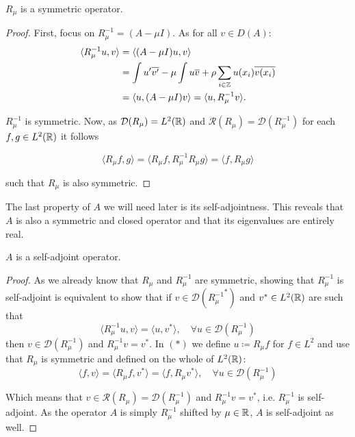 \begin{theorem} \label{2.2:thm-R_muSymmetric}
	$R_{\mu}$ is a symmetric operator.
	
	\begin{proof}
		First, focus on $R_{\mu}^{-1} = (A - \mu I)$. As for all $v \in D(A)$:
			\begin{align*}
				\langle R_{\mu}^{-1} u, v \rangle & = \langle (A - \mu I) u, v \rangle \\
					& = \int u'\overline{v'} -  \mu \int u \overline{v} + \rho \sum_{i \in \mathbb{Z}} u(x_{i}) \overline{v(x_{i})} \\
					& = \langle u, (A - \mu I) v \rangle = \langle u,  R_{\mu}^{-1} v \rangle.
			\end{align*}

		$R_{\mu}^{-1}$ is symmetric. Now, as $\mathcal{D}(R_{\mu}) = L^{2}(\mathbb{R})$ and $\mathcal{R}(R_{\mu}) = \mathcal{D}(R_{\mu}^{-1})$ for each $f, g \in L^{2}(\mathbb{R})$ it follows
		
		\[  \langle R_{\mu} f, g \rangle =  \langle R_{\mu} f, R_{\mu}^{-1} R_{\mu} g \rangle = \langle f, R_{\mu} g \rangle \]
		
		such that $R_{\mu}$ is also symmetric.
	\end{proof}
\end{theorem}

The last property of $A$ we will need later is its self-adjointness. This reveals that $A$ is also a symmetric and closed operator and that its eigenvalues are entirely real. 

\begin{theorem} \label{2.3:thm-ASelfAdjoint}
	$A$ is a self-adjoint operator.
		
	\begin{proof}
		As we already know that $R_{\mu}$ and $R_{\mu}^{-1}$ are symmetric, showing that $R_{\mu}^{-1}$ is self-adjoint is equivalent to show that if $v \in \mathcal{D}({R_{\mu}^{-1}}^{*})$ and $v^{*} \in L^{2}(\mathbb{R})$ are such that
		\[ \langle R_{\mu}^{-1} u, v \rangle = \langle u, v^{*} \rangle, \quad \forall u \in \mathcal{D}(R_{\mu}^{-1}) \tag*{(*)} \]
		then $v \in \mathcal{D}(R_{\mu}^{-1})$ and $R_{\mu}^{-1} v = v^{*}$.
		In $(*)$ we define $u \coloneqq R_{\mu} f$ for $f \in L^{2}$ and use that $R_{\mu}$ is symmetric and defined on the whole of $L^{2}(\mathbb{R})$:
		\[  \langle f, v \rangle = \langle R_{\mu} f, v^{*} \rangle = \langle f, R_{\mu} v^{*} \rangle, \quad \forall u \in \mathcal{D}(R_{\mu}^{-1}) \]
		
		Which means that $v \in \mathcal{R}(R_{\mu}) = \mathcal{D}(R_{\mu}^{-1})$ and $R_{\mu}^{-1} v = v^{*}$, i.e. $R_{\mu}^{-1}$ is self-adjoint. As the operator $A$ is simply $R_{\mu}^{-1}$ shifted by $\mu \in \mathbb{R}$, $A$ is self-adjoint as well.		
	\end{proof}
\end{theorem}
